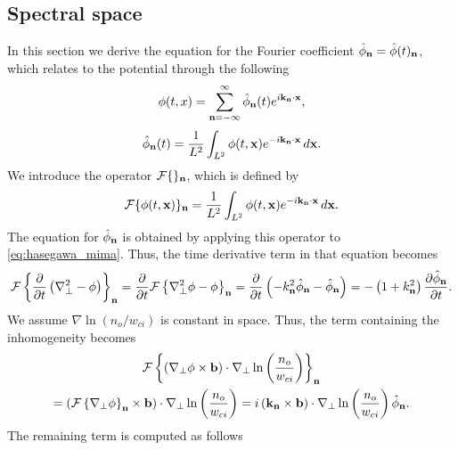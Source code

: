 \documentclass[oneside,a4paper,11pt]{report}
\begin{document}
\subsection{Spectral space}
In this section we derive the equation for the Fourier coefficient $\hat{\phi}_{\mathbf{n}} = \hat{\phi}(t)_{\mathbf{n}}$, which relates to the potential through the following
\begin{equation}
    \phi(t,x) = \sum_{\mathbf{n}=-\infty}^\infty \hat{\phi}_{\mathbf{n}}(t) e^{i \mathbf{k}_{\mathbf{n}} \cdot \mathbf{x}},
\end{equation}
\begin{equation}
    \hat{\phi}_{\mathbf{n}}(t)= \frac{1}{L^2} \int_{L^2} \phi(t, \mathbf{x}) e^{-i \mathbf{k}_{\mathbf{n}} \cdot \mathbf{x}} \, d\mathbf{x} .
\end{equation}
We introduce the operator $\mathcal{F} \{ \}_{\mathbf{n}}$, which is defined by
\begin{equation}
    \mathcal{F} \{ \phi(t,\mathbf{x}) \}_{\mathbf{n}} = \frac{1}{L^2} \int_{L^2} \phi(t, \mathbf{x}) e^{-i \mathbf{k}_{\mathbf{n}} \cdot \mathbf{x}} \, d\mathbf{x} .
\end{equation}
The equation for $\hat{\phi}_{\mathbf{n}}$ is obtained by applying this operator to \cref{eq:hasegawa_mima}. Thus, the time derivative term in that equation becomes 
\begin{equation}
    \mathcal{F} \left \{ \frac{\partial}{\partial t} \left ( \nabla_\perp^2 - \phi \right ) \right \}_{\mathbf{n}} = \frac{\partial}{\partial t} \mathcal{F} \left \{ \nabla_\perp^2 \phi - \phi \right \}_{\mathbf{n}} = \frac{\partial}{\partial t} \left ( -k_{\mathbf{n}}^2 \hat{\phi}_{\mathbf{n}} - \hat{\phi}_{\mathbf{n}} \right ) = - \left ( 1 + k^2_{\mathbf{n}} \right ) \frac{\partial \hat{\phi}_{\mathbf{n}}}{\partial t}.
\end{equation}
We assume $\nabla \ln (n_o / w_{ci})$ is constant in space. Thus, the term containing the inhomogeneity becomes 
\begin{multline}
    \mathcal{F} \left \{ \left ( \nabla_\perp \phi \times \mathbf{b} \right ) \cdot \nabla_\perp \ln \left ( \frac{n_o}{w_{ci}} \right ) \right \}_{\mathbf{n}} \\
    = \left ( \mathcal{F} \left \{ \nabla_\perp \phi \right \}_{\mathbf{n}} \times \mathbf{b} \right ) \cdot \nabla_\perp \ln \left ( \frac{n_o}{w_{ci}} \right ) = i \left ( \mathbf{k}_{\mathbf{n}} \times \mathbf{b} \right ) \cdot \nabla_\perp \ln \left ( \frac{n_o}{w_{ci}} \right ) \hat{\phi}_{\mathbf{n}}.
\end{multline}
The remaining term is computed as follows
\end{document}
